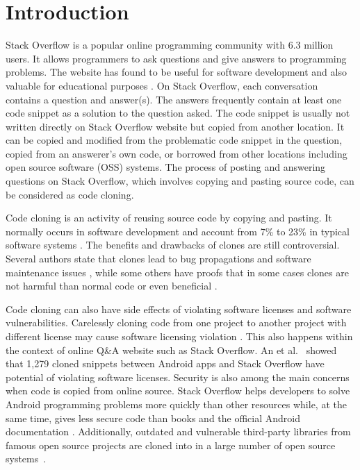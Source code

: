 \documentclass{sig-alternate-05-2015}
\begin{document}
\section{Introduction}
Stack Overflow is a popular online programming community with 6.3 million users. It allows programmers to ask questions and give answers to programming problems. The website has found to be useful for software development \cite{Ponzanelli2013,Ponzanelli2014,Diamantopoulos2015,Keivanloo2014,Park2014, Stolee2014,Subramanian2013,Diamantopoulos2015,Treude2016} and also valuable for educational purposes \cite{Nasehi2012}. On Stack Overflow, each conversation contains a question and answer(s).  The answers frequently contain at least one code snippet as a solution to the question asked. The code snippet is usually not written directly on Stack Overflow website but copied from another location. It can be copied and modified from the problematic code snippet in the question, copied from an answerer's own code, or borrowed from other locations including open source software (OSS) systems. The process of posting and answering questions on Stack Overflow, which involves copying and pasting source code, can be considered as code cloning. 

Code cloning is an activity of reusing source code by copying and pasting. It normally occurs in software development and account from 7\% to 23\% in typical software systems \cite{Bellon2007}. The benefits and drawbacks of clones are still controversial. Several authors state that clones lead to bug propagations and software maintenance issues \cite{Kamiya2002}, while some others have proofs that in some cases clones are not harmful than normal code or even beneficial \cite{Saini2016,Kapser2006}. 

Code cloning can also have side effects of violating software licenses and software vulnerabilities. Carelessly cloning code from one project to another project with different license may cause software licensing violation \cite{German2009}. This also happens within the context of online Q\&A website such as Stack Overflow. An et al.~\cite{An2017} showed that 1,279 cloned snippets between Android apps and Stack Overflow have potential of violating software licenses. Security is also among the main concerns when code is copied from online source. Stack Overflow helps developers to solve Android programming problems more quickly than other resources while, at the same time, gives less secure code than books and the official Android documentation \cite{Acar2016}. Additionally, outdated and vulnerable third-party libraries from famous open source projects are cloned into in a large number of open source systems~\cite{Xia2014}.
\end{document}
